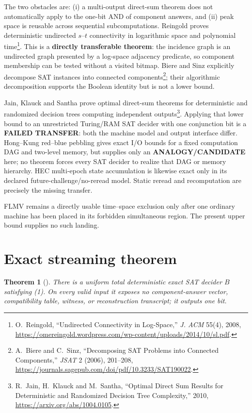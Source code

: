 \documentclass[11pt]{article}
\newtheorem{theorem}{Theorem}
\newcommand{\claim}[1]{\texttt{\detokenize{#1}}}
\begin{document}
The two obstacles are: (i) a multi-output direct-sum theorem does not
automatically apply to the one-bit AND of component answers, and (ii) peak
space is reusable across sequential subcomputations.  Reingold proves
deterministic undirected $s$--$t$ connectivity in logarithmic space and
polynomial time\footnote{O.~Reingold, ``Undirected Connectivity in
Log-Space,'' \emph{J. ACM} 55(4), 2008,
\url{https://omereingold.wordpress.com/wp-content/uploads/2014/10/sl.pdf}.}.
This is a \textbf{directly transferable theorem}: the incidence graph is an
undirected graph presented by a log-space adjacency predicate, so component
membership can be tested without a visited bitmap.  Biere and Sinz explicitly
decompose SAT instances into connected components\footnote{A.~Biere and
C.~Sinz, ``Decomposing SAT Problems into Connected Components,''
\emph{JSAT} 2 (2006), 201--208,
\url{https://journals.sagepub.com/doi/pdf/10.3233/SAT190022}.}; their algorithmic
decomposition supports the Boolean identity but is not a lower bound.

Jain, Klauck and Santha prove optimal direct-sum theorems for deterministic
and randomized decision trees computing independent outputs\footnote{R.~Jain,
H.~Klauck and M.~Santha, ``Optimal Direct Sum Results for Deterministic and
Randomized Decision Tree Complexity,'' 2010,
\url{https://arxiv.org/abs/1004.0105}.}.  Applying that lower bound to an
unrestricted Turing/RAM SAT decider with one conjunction bit is a
\textbf{FAILED TRANSFER}: both the machine model and output interface differ.
Hong--Kung red--blue pebbling gives exact I/O bounds for a fixed computation
DAG and two-level memory, but supplies only an \textbf{ANALOGY/CANDIDATE}
here; no theorem forces every SAT decider to realize that DAG or memory
hierarchy.  HEC multi-epoch state accumulation is likewise exact only in its
declared future-challenge/no-reread model.  Static reread and recomputation are
precisely the missing transfer.

FLMV remains a directly usable time--space exclusion only after one ordinary
machine has been placed in its forbidden simultaneous region.  The present
upper bound supplies no such landing.

\section{Exact streaming theorem}

\begin{theorem}[\claim{PRODUCT-STREAM-SPACE-UPPER-BOUND1}]
There is a uniform total deterministic exact SAT decider $B$ satisfying (1).
On every valid input it exposes no component-answer vector, compatibility
table, witness, or reconstruction transcript; it outputs one bit.
\end{theorem}
\end{document}
